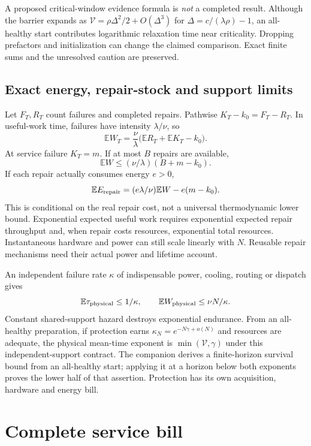 \documentclass[10pt,a4paper]{article}
\newcommand{\E}{\mathbb E}\newcommand{\Pp}{\mathbb P}
\begin{document}
A proposed critical-window evidence formula is \emph{not} a completed result. Although the barrier expands as $\mathcal V=\rho\Delta^2/2+O(\Delta^3)$ for
$\Delta=c/(\lambda\rho)-1$, an all-healthy start contributes logarithmic relaxation time near criticality. Dropping prefactors and initialization can change the claimed comparison. Exact finite sums and the unresolved caution are preserved.

\subsection{Exact energy, repair-stock and support limits}

Let $F_T,R_T$ count failures and completed repairs. Pathwise
$K_T-k_0=F_T-R_T$. In useful-work time, failures have intensity $\lambda/\nu$, so
\begin{equation}
\boxed{\E W_T=\frac{\nu}{\lambda}
\bigl(\E R_T+\E K_T-k_0\bigr).}
\label{eq:energy}
\end{equation}
At service failure $K_T=m$. If at most $B$ repairs are available,
\[
\E W\le(\nu/\lambda)(B+m-k_0).
\]
If each repair actually consumes energy $e>0$,
\[
\E E_{\rm repair}=(e\lambda/\nu)\E W-e(m-k_0).
\]
This is conditional on the real repair cost, not a universal thermodynamic lower bound. Exponential expected useful work requires exponential expected repair throughput and, when repair costs resources, exponential total resources. Instantaneous hardware and power can still scale linearly with $N$. Reusable repair mechanisms need their actual power and lifetime account.

An independent failure rate $\kappa$ of indispensable power, cooling, routing or dispatch gives
\[
\E\tau_{\rm physical}\le1/\kappa,\qquad
\E W_{\rm physical}\le\nu N/\kappa.
\]
Constant shared-support hazard destroys exponential endurance. From an all-healthy preparation, if protection earns
$\kappa_N=e^{-N\gamma+o(N)}$ and resources are adequate, the physical mean-time exponent is $\min(\mathcal V,\gamma)$ under this independent-support contract. The companion derives a finite-horizon survival bound from an all-healthy start; applying it at a horizon below both exponents proves the lower half of that assertion. Protection has its own acquisition, hardware and energy bill.

\section{Complete service bill}
\end{document}
